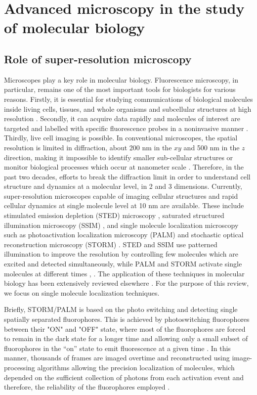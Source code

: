 \section{Advanced microscopy in the study of molecular biology}
\subsection{Role of super-resolution microscopy }
Microscopes play a key role in molecular biology. Fluorescence microscopy, in particular, remains one of the most important tools for biologists for various reasons. Firstly, it is essential for studying communications of biological molecules inside living cells, tissues, and whole organisms and subcellular structures at high resolution \citep{Han2013}. Secondly, it can acquire data rapidly and molecules of interest are targeted and labelled with specific fluorescence probes in a noninvasive manner \citep{Han2013}. Thirdly, live cell imaging is possible. In conventional microscopes, the spatial resolution is limited in diffraction, about 200 nm in the $xy$ and 500 nm in the $z$ direction, making it impossible to identify smaller sub-cellular structures or monitor biological processes which occur at nanometer scale \citep{Xu2017}. Therefore, in the past two decades, efforts to break the diffraction limit in order to understand cell structure and dynamics at a molecular level, in 2 and 3 dimensions. Currently, super-resolution microscopes capable of imaging cellular structures and rapid cellular dynamics at single molecule level at 10 nm are available. These include stimulated emission depletion (STED) microscopy \citep{Klar1999}, saturated structured illumination microscopy (SSIM) \citep{Gustafsson2005}, and single molecule localization microscopy such as  photoactivation localization microscopy (PALM) \citep{Betzig2006} and stochastic optical reconstruction microscopy (STORM) \citep{Huang2008,Xu2017}. STED and SSIM use patterned illumination to improve the resolution by controlling few molecules which are excited and detected simultaneously, while PALM and STORM activate single molecules at different times \citep{Han2013}, . The application of these techniques in molecular biology has been extensively reviewed elsewhere \citep{Han2013}. For the purpose of this review, we focus on single molecule localization techniques.  

Briefly, STORM/PALM is based on the photo switching and detecting single spatially separated fluorophores. This is achieved by photoswitching  fluorophores between their  "ON" and "OFF" state, where most of the fluorophores are forced to remain in the dark state for a longer time and allowing only a small subset of fluorophores  in  the “on” state to emit fluorescence at a given time \citep{Turkowyd2016}. In this manner, thousands of frames are imaged overtime  and reconstructed using image-processing algorithms allowing the precision localization of molecules, which depended on the sufficient collection of photons from each activation event and therefore, the reliability of the fluorophores employed \citep{Turkowyd2016,Xu2017}.

